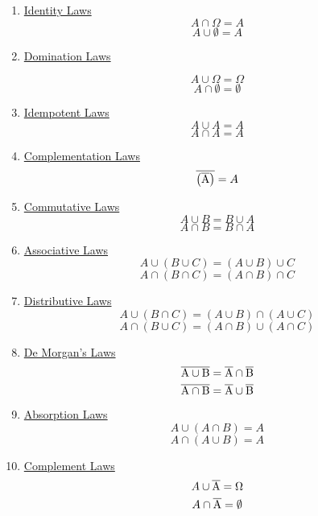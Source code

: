 \documentclass[12pt]{article}
\begin{document}
\begin{enumerate}
\item \underline{Identity Laws}
\[
	A \cap \Omega = A
\]
\[
	A \cup \emptyset = A
\]
\item \underline{Domination Laws}

\[
	A \cup \Omega = \Omega
\]
\[
	A \cap \emptyset = \emptyset
\]
\item \underline{Idempotent Laws}
\[
	A \cup A = A
\]
\[
	A \cap A = A
\]
\item \underline{Complementation Laws}
\[
	\overline{\left ( \overline{\rm A} \right ) } = A
\]
\item \underline{Commutative Laws}
\[
	A \cup B = B \cup A
\]
\[
	A \cap B = B \cap A
\]
\item \underline{Associative Laws}
\[
	A \cup \left ( B \cup C \right ) =  \left ( A \cup B \right ) \cup C 
\]
\[
	A \cap \left ( B \cap C \right ) =  \left ( A \cap B \right ) \cap C 
\]
\item \underline{Distributive Laws}
\[
	A \cup \left ( B \cap C \right ) =  \left ( A \cup B \right ) \cap \left ( A \cup C \right )
\]
\[
	A \cap \left ( B \cup C \right ) =  \left ( A \cap B \right ) \cup \left ( A \cap C \right )
\]
\item \underline{De Morgan's Laws}
\[
	\overline{\rm A \cup B} = \overline{\rm A} \cap \overline{\rm B}
\]
\[
	\overline{\rm A \cap B} = \overline{\rm A} \cup \overline{\rm B}
\]
\item \underline{Absorption Laws}
\[
	A \cup \left ( A \cap B \right ) = A
\]
\[
	A \cap \left ( A \cup B \right ) = A
\]
\item \underline{Complement Laws}
\[
	A \cup \overline{\rm A} = \Omega
\]
\[
	A \cap \overline{\rm A} = \emptyset
\]
\end{enumerate}
\end{document}
